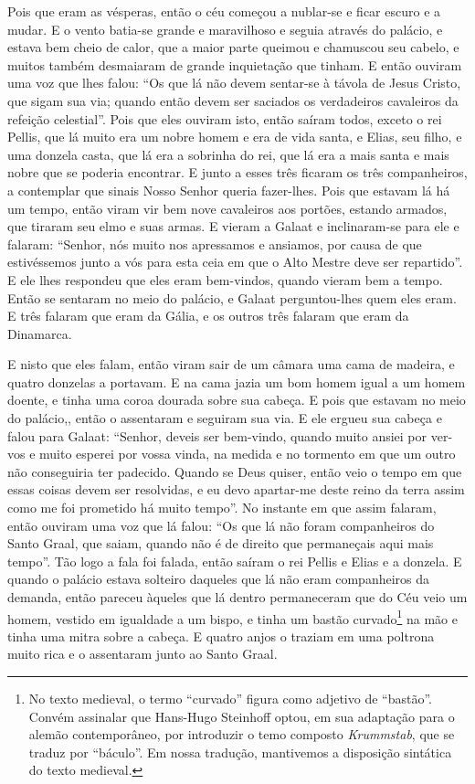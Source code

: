 Pois que eram as vésperas, então o céu começou a nublar-se e ficar escuro e a
mudar. E o vento batia-se grande e maravilhoso e seguia através do palácio, e
estava bem cheio de calor, que a maior parte queimou e chamuscou seu cabelo, e
muitos também desmaiaram de grande inquietação que tinham. E então ouviram uma
voz que lhes falou: “Os que lá não devem sentar-se à távola de Jesus Cristo,
que sigam sua via; quando então devem ser saciados os verdadeiros cavaleiros da
refeição celestial”. Pois que eles ouviram isto, então saíram todos,
exceto o rei Pellis, que lá muito era um nobre homem e era de vida santa, e
Elias, seu filho, e uma donzela casta, que lá era a sobrinha do rei, que lá era
a mais santa e mais nobre que se poderia encontrar. E junto a esses três
ficaram os três companheiros, a contemplar que sinais Nosso Senhor queria
fazer-lhes. Pois que estavam lá há um tempo, então viram vir bem nove
cavaleiros aos portões, estando armados, que tiraram seu elmo e suas armas. E
vieram a Galaat e inclinaram-se para ele e falaram: “Senhor, nós muito nos
apressamos e ansiamos, por causa de que estivéssemos junto a vós para esta ceia
em que o Alto Mestre deve ser repartido”. E ele lhes respondeu que eles eram
bem-vindos, quando vieram bem a tempo. Então se sentaram no meio do palácio, e
Galaat perguntou-lhes quem eles eram. E três falaram que eram da Gália, e os
outros três falaram que eram da Dinamarca. 

E nisto que eles falam, então viram sair de um câmara uma cama de madeira, e
quatro donzelas a portavam. E na cama jazia um bom homem igual a um homem
doente, e tinha uma coroa dourada sobre sua cabeça. E pois que estavam no meio
do palácio,,  então o assentaram e seguiram sua via. E ele ergueu sua cabeça e
falou para Galaat: “Senhor, deveis ser bem-vindo, quando muito ansiei por
ver-vos e muito esperei por vossa vinda, na medida e no tormento em que um
outro não conseguiria ter padecido. Quando se Deus quiser, então veio o tempo
em que essas coisas devem ser resolvidas, e eu devo apartar-me deste reino da
terra assim como me foi prometido há muito tempo”. No instante em que assim
falaram, então ouviram uma voz que lá falou: “Os que lá não foram companheiros
do Santo Graal, que saiam, quando não é de direito que permaneçais aqui mais
tempo”. Tão logo a fala foi falada, então saíram o rei Pellis e Elias
e a donzela. E quando o palácio estava solteiro daqueles que lá não eram
companheiros da demanda, então pareceu àqueles que lá dentro permaneceram que
do Céu veio um homem, vestido em igualdade a um bispo, e tinha um bastão
curvado\footnote{No texto medieval, o termo “curvado”  
figura como adjetivo de “bastão”. Convém assinalar que
Hans-Hugo Steinhoff optou, em sua adaptação para o alemão contemporâneo, por
introduzir o temo composto \textit{Krummstab}, que se traduz por “báculo”. Em
nossa tradução, mantivemos a disposição sintática do texto medieval.} 
na mão e tinha uma mitra sobre a cabeça. E quatro anjos o traziam em uma
poltrona muito rica e o assentaram junto ao Santo Graal. 

